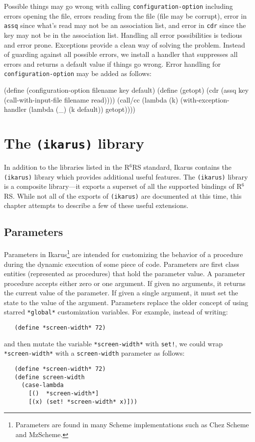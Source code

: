 \documentclass[onecolumn, 12pt, twoside, openright, dvipdfm]{book}
\newcommand{\rnrs}[1]{R$^{\mathrm{#1}}$RS}
\begin{document}
Possible things may go wrong with calling
\texttt{configuration-option} including errors opening the file,
errors reading from the file (file may be corrupt), error in
\texttt{assq} since what's read may not be an association list, and
error in \texttt{cdr} since the key may not be in the association
list.  Handling all error possibilities is tedious and error prone.  
Exceptions provide a clean way of solving the problem.  Instead of
guarding against all possible errors, we install a handler that
suppresses all errors and returns a default value if things go
wrong.  Error handling for \texttt{configuration-option} may be
added as follows:

\begin{CodeInline}
(define (configuration-option filename key default)
  (define (getopt)
    (cdr (assq key (call-with-input-file filename read))))
  (call/cc
    (lambda (k)
      (with-exception-handler 
        (lambda (_) (k default))
        getopt))))
\end{CodeInline}


\chapter{\label{chapter:ikarus}The \texttt{(ikarus)} library}

In addition to the libraries listed in the \rnrs{6} standard, Ikarus
contains the \texttt{(ikarus)} library which provides additional
useful features.  The \texttt{(ikarus)} library is a composite
library---it exports a superset of all the supported bindings of
\rnrs{6}.  While not all of the exports of \texttt{(ikarus)} are
documented at this time, this chapter attempts to describe a few of
these useful extensions.  

\newpage
\section{Parameters}

Parameters in Ikarus\footnote{Parameters are found in many Scheme
implementations such as Chez Scheme and MzScheme.} are intended for
customizing the behavior of a procedure during the dynamic execution
of some piece of code.  Parameters are first class entities
(represented as procedures) that hold the parameter value.  A
parameter procedure accepts either zero or one argument.  If given
no arguments, it returns the current value of the parameter.  If
given a single argument, it must set the state to the value of the
argument.  Parameters replace the older concept of using starred
\texttt{*global*} customization variables.  For example, instead of
writing:
\begin{verbatim}
   (define *screen-width* 72)
\end{verbatim}
and then mutate the variable \texttt{*screen-width*} with
\texttt{set!}, we could wrap \texttt{*screen-width*} with a 
\texttt{screen-width} parameter as follows:
\begin{verbatim}
   (define *screen-width* 72)
   (define screen-width 
     (case-lambda
       [()  *screen-width*]
       [(x) (set! *screen-width* x)]))
\end{verbatim}
\end{document}
